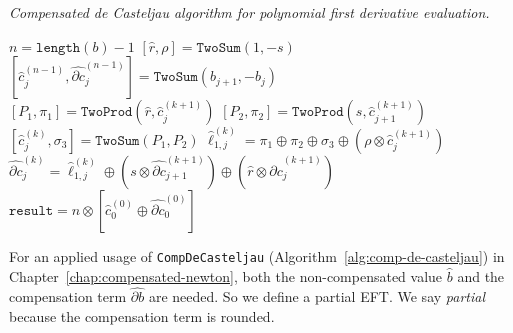 \begin{breakablealgorithm}
  \caption{\textit{Compensated de Casteljau
      algorithm for polynomial first derivative evaluation.}}
  \label{alg:comp-de-casteljau-derivative}

  \begin{algorithmic}
      \State \(n = \texttt{length}(b) - 1\)
      \State \(\left[\widehat{r}, \rho\right] = \mathtt{TwoSum}(1, -s)\)
      \\
        \State \(\left[\widehat{c}_j^{(n - 1)},
          \widehat{\partial c}_j^{(n - 1)}\right] =
          \mathtt{TwoSum}(b_{j + 1}, -b_j)\)
      \EndFor
      \\
          \State \(\left[P_1, \pi_1\right] = \mathtt{TwoProd}\left(
              \widehat{r}, \widehat{c}_j^{(k + 1)}\right)\)
          \State \(\left[P_2, \pi_2\right] = \mathtt{TwoProd}\left(
              s, \widehat{c}_{j + 1}^{(k + 1)}\right)\)
          \State \(\left[\widehat{c}_j^{(k)}, \sigma_3\right] =
              \mathtt{TwoSum}(P_1, P_2)\)
          \State \(\widehat{\ell}_{1, j}^{(k)} = \pi_1 \oplus \pi_2 \oplus
              \sigma_3 \oplus \left(\rho \otimes
              \widehat{c}_j^{(k + 1)}\right)\)
          \State \(\widehat{\partial c}_j^{(k)} =
              \widehat{\ell}_{1, j}^{(k)} \oplus
              \left(s \otimes \widehat{\partial c}_{j + 1}^{(k + 1)}
              \right) \oplus
              \left(\widehat{r} \otimes
              \widehat{\partial c}_j^{(k + 1)}\right)\)
        \EndFor
      \EndFor
      \\
      \State \(\mathtt{result} = n \otimes \left[\widehat{c}_0^{(0)} \oplus
          \widehat{\partial c}_0^{(0)}\right]\)
    \EndFunction
  \end{algorithmic}
\end{breakablealgorithm}

For an applied usage of \texttt{CompDeCasteljau}
(Algorithm~\ref{alg:comp-de-casteljau}) in
Chapter~\ref{chap:compensated-newton}, both the non-compensated
value \(\widehat{b}\) and the compensation term \(\widehat{\partial b}\) are
needed. So we define a partial EFT. We say \emph{partial} because
the compensation term is rounded.

